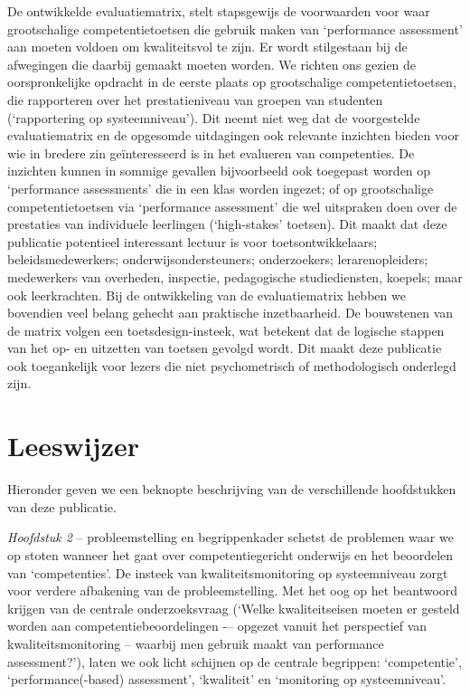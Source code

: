\documentclass[
  letterpaper,
]{report}
\begin{document}
De ontwikkelde evaluatiematrix, stelt stapsgewijs de voorwaarden voor
waar grootschalige competentietoetsen die gebruik maken van `performance
assessment' aan moeten voldoen om kwaliteitsvol te zijn. Er wordt
stilgestaan bij de afwegingen die daarbij gemaakt moeten worden. We
richten ons gezien de oorspronkelijke opdracht in de eerste plaats op
grootschalige competentietoetsen, die rapporteren over het
prestatieniveau van groepen van studenten (`rapportering op
systeemniveau'). Dit neemt niet weg dat de voorgestelde evaluatiematrix
en de opgesomde uitdagingen ook relevante inzichten bieden voor wie in
bredere zin geïnteresseerd is in het evalueren van competenties. De
inzichten kunnen in sommige gevallen bijvoorbeeld ook toegepast worden
op `performance assessments' die in een klas worden ingezet; of op
grootschalige competentietoetsen via `performance assessment' die wel
uitspraken doen over de prestaties van individuele leerlingen
(`high-stakes' toetsen). Dit maakt dat deze publicatie potentieel
interessant lectuur is voor toetsontwikkelaars; beleidsmedewerkers;
onderwijsondersteuners; onderzoekers; lerarenopleiders; medewerkers van
overheden, inspectie, pedagogische studiediensten, koepels; maar ook
leerkrachten. Bij de ontwikkeling van de evaluatiematrix hebben we
bovendien veel belang gehecht aan praktische inzetbaarheid. De
bouwstenen van de matrix volgen een toetsdesign-insteek, wat betekent
dat de logische stappen van het op- en uitzetten van toetsen gevolgd
wordt. Dit maakt deze publicatie ook toegankelijk voor lezers die niet
psychometrisch of methodologisch onderlegd zijn.

\hypertarget{leeswijzer}{%
\section{Leeswijzer}\label{leeswijzer}}

Hieronder geven we een beknopte beschrijving van de verschillende
hoofdstukken van deze publicatie.

\emph{Hoofdstuk 2} -- probleemstelling en begrippenkader schetst de
problemen waar we op stoten wanneer het gaat over competentiegericht
onderwijs en het beoordelen van `competenties'. De insteek van
kwaliteitsmonitoring op systeemniveau zorgt voor verdere afbakening van
de probleemstelling. Met het oog op het beantwoord krijgen van de
centrale onderzoeksvraag (`Welke kwaliteitseisen moeten er gesteld
worden aan competentiebeoordelingen -\/-- opgezet vanuit het perspectief
van kwaliteitsmonitoring -- waarbij men gebruik maakt van performance
assessment?'), laten we ook licht schijnen op de centrale begrippen:
`competentie', `performance(-based) assessment', `kwaliteit' en
`monitoring op systeemniveau'.
\end{document}
